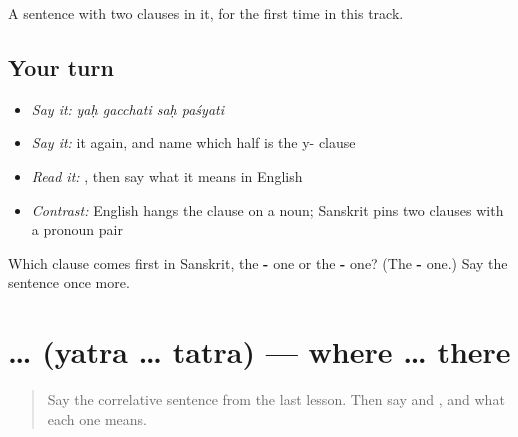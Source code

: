 \begin{grammarlens}[title={What you've built}]
A sentence with two clauses in it, for the first time in this track.
\end{grammarlens}

\subsection*{Your turn}
\begin{itemize}
\raggedright
  \item \emph{Say it:} \emph{yaḥ gacchati saḥ paśyati}
  \item \emph{Say it:} it again, and name which half is the y- clause
  \item \emph{Read it:} \textbf{   }, then say what it means in English
  \item \emph{Contrast:} English hangs the clause on a noun; Sanskrit pins two clauses with a pronoun pair
\end{itemize}

\begin{tcolorbox}[breakable,colback=teal!4,colframe=teal!35!black,title={Before you move on}]
Which clause comes first in Sanskrit, the \textbf{-} one or the \textbf{-} one? (The \textbf{-} one.) Say the sentence once more.
\end{tcolorbox}
\section[\texorpdfstring{\sk{यत्र} … \sk{तत्र} (yatra … tatra)}{यत्र … तत्र (yatra … tatra)}]{ …  (yatra … tatra) — where … there}

\label{lesson:SA-C53-yatra-tatra}



\begin{quote}
Say the correlative sentence from the last lesson. Then say \textbf{} and \textbf{}, and what each one means.
\end{quote}

